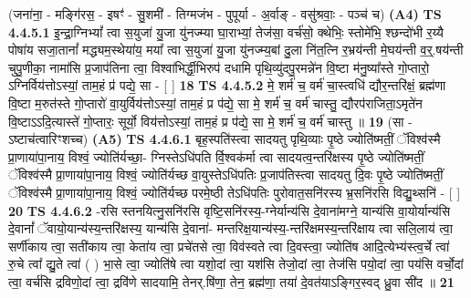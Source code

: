 \documentclass[17pt]{extarticle}
\begin{document}
                  \newline
                      (जना॑ना॒ - मङ्गि॑रस॒ - इषꣳ॑ - सु॒शमी॑ - तिग्मजंभ - पुपूर्या - अ॒र्वाङ् - वसु॑श्रवाः॒ - पञ्च॑ च)  \textbf{(A4)} \newline \newline
                                        \textbf{ TS 4.4.5.1} \newline
                  इ॒न्द्रा॒ग्निभ्यां᳚ त्वा स॒युजा॑ यु॒जा यु॑नज्म्या घा॒राभ्यां॒ तेज॑सा॒ वर्च॑सो॒ क्थेभिः॒ स्तोमे॑भि॒ श्छन्दो॑भी र॒य्यै पोषा॑य सजा॒तानां᳚ मद्ध्यम॒स्थेया॑य॒ मया᳚ त्वा स॒युजा॑ यु॒जा यु॑नज्म्य॒बां दु॒ला नि॑त॒त्नि र॒भ्रय॑न्ती मे॒घय॑न्ती व॒र्॒.षय॑न्ती चुपु॒णीका॒ नामा॑सि प्र॒जाप॑तिना त्वा॒ विश्वा॑भिर्द्धी॒भिरुप॑ दधामि पृथि॒व्यु॑दपु॒रमन्ने॑न वि॒ष्टा म॑नु॒ष्या᳚स्ते गो॒प्तारो॒ ऽग्निर्विय॑त्तोऽस्यां॒ ताम॒हं प्र॑ पद्ये॒ सा - [  ] \textbf{  18} \newline
                  \newline
                                \textbf{ TS 4.4.5.2} \newline
                  मे॒ शर्म॑ च॒ वर्म॑ चा॒स्त्वधि॑ द्यौर॒न्तरि॑क्षं॒ ब्रह्म॑णा वि॒ष्टा म॒रुत॑स्ते गो॒प्तारो॑ वा॒युर्विय॑त्तोऽस्यां॒ ताम॒हं प्र प॑द्ये॒ सा मे॒ शर्म॑ च॒ वर्म॑ चास्तु॒ द्यौरप॑राजिता॒ऽमृते॑न वि॒ष्टाऽऽदि॒त्यास्ते॑ गो॒प्तारः॒ सूर्यो॒ विय॑त्तोऽस्यां॒ ताम॒हं प्र प॑द्ये॒ सा मे॒ शर्म॑ च॒ वर्म॑ चास्तु ॥ \textbf{  19} \newline
                  \newline
                      (सा - ऽष्टाच॑त्वारिꣳशच्च)  \textbf{(A5)} \newline \newline
                                        \textbf{ TS 4.4.6.1} \newline
                  बृह॒स्पति॑स्त्वा सादयतु पृथि॒व्याः पृ॒ष्ठे ज्योति॑ष्मतीं॒ ॅविश्व॑स्मै प्रा॒णाया॑पा॒नाय॒ विश्वं॒ ज्योति॑र्यच्छा॒- ग्निस्तेऽधि॑पति र्वि॒श्वक॑र्मा त्वा सादयत्व॒न्तरि॑क्षस्य पृ॒ष्ठे ज्योति॑ष्मतीं॒ ॅविश्व॑स्मै प्रा॒णाया॑पा॒नाय॒ विश्वं॒ ज्योति॑र्यच्छ वा॒युस्तेऽधि॑पतिः प्र॒जाप॑तिस्त्वा सादयतु दि॒वः पृ॒ष्ठे ज्योति॑ष्मतीं॒ ॅविश्व॑स्मै प्रा॒णाया॑पा॒नाय॒ विश्वं॒ ज्योति॑र्यच्छ परमे॒ष्ठी तेऽधि॑पतिः पुरोवात॒सनि॑रस्य भ्र॒सनि॑रसि विद्यु॒थ्सनि॑ - [  ] \textbf{  20} \newline
                  \newline
                                \textbf{ TS 4.4.6.2} \newline
                  -रसि स्तनयित्नु॒सनि॑रसि वृष्टि॒सनि॑रस्य॒-ग्नेर्यान्य॑सि दे॒वाना॑मग्ने॒ यान्य॑सि वा॒योर्यान्य॑सि दे॒वानां᳚ ॅवायो॒यान्य॑स्य॒न्तरि॑क्षस्य॒ यान्य॑सि दे॒वाना॑- मन्तरिक्ष॒यान्य॑स्य॒-न्तरि॑क्षमस्य॒न्तरि॑क्षाय त्वा सलि॒लाय॑ त्वा॒ सर्णी॑काय त्वा॒ सती॑काय त्वा॒ केता॑य त्वा॒ प्रचे॑तसे त्वा॒ विव॑स्वते त्वा दि॒वस्त्वा॒ ज्योति॑ष आदि॒त्येभ्य॑स्त्व॒र्चे त्वा॑ रु॒चे त्वा᳚ द्यु॒ते त्वा॑ ( ) भा॒से त्वा॒ ज्योति॑षे त्वा यशो॒दां त्वा॒ यश॑सि तेजो॒दां त्वा॒ तेज॑सि पयो॒दां त्वा॒ पय॑सि वर्चो॒दां त्वा॒ वर्च॑सि द्रविणो॒दां त्वा॒ द्रवि॑णे सादयामि॒ तेनर्.षि॑णा॒ तेन॒ ब्रह्म॑णा॒ तया॑ दे॒वत॑याऽङ्गिर॒स्वद् ध्रु॒वा सी॑द ॥ \textbf{  21} \newline
\end{document}

